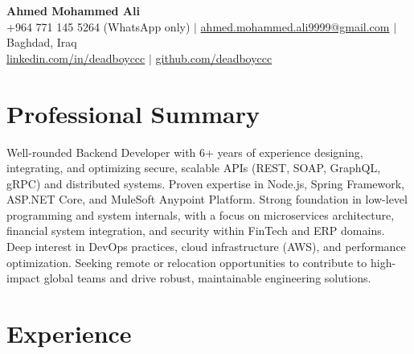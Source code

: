 \documentclass[11pt]{article}
\begin{document}
\begin{center}
  {\LARGE \textbf{Ahmed Mohammed Ali}}\\[0.2cm]
  +964 771 145 5264 (WhatsApp only) $\vert$ \href{mailto:ahmed.mohammed.ali9999@gmail.com}{ahmed.mohammed.ali9999@gmail.com} $\vert$ Baghdad, Iraq\\
  \href{https://www.linkedin.com/in/deadboyccc}{linkedin.com/in/deadboyccc} $\vert$ \href{https://github.com/deadboyccc}{github.com/deadboyccc}
\end{center}

\section*{Professional Summary}
Well-rounded Backend Developer with 6+ years of experience designing, integrating, and optimizing secure, scalable APIs (REST, SOAP, GraphQL, gRPC) and distributed systems. Proven expertise in Node.js, Spring Framework, ASP.NET Core, and MuleSoft Anypoint Platform. Strong foundation in low-level programming and system internals, with a focus on microservices architecture, financial system integration, and security within FinTech and ERP domains. Deep interest in DevOps practices, cloud infrastructure (AWS), and performance optimization. Seeking remote or relocation opportunities to contribute to high-impact global teams and drive robust, maintainable engineering solutions.

\section*{Experience}
\end{document}
